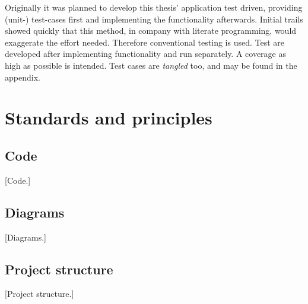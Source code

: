\documentclass[10pt, openright, notitlepage]{scrreprt}
\begin{document}
\begin{center}
\end{center}

Originally it was planned to develop this thesis' application test driven,
providing (unit-) test-cases first and implementing the functionality
afterwards. Initial trails showed quickly that this method, in company with
literate programming, would exaggerate the effort needed. Therefore conventional
testing is used. Test are developed after implementing functionality and run
separately. A coverage as high as possible is intended. Test cases are \emph{tangled}
too, and may be found in the appendix.
\begin{center}
\end{center}

\section{Standards and principles}
\label{sec:orga96e158}
\subsection{Code}
\label{sec:org7381509}

[Code.]

\subsection{Diagrams}
\label{sec:orgabc6487}

[Diagrams.]

\subsection{Project structure}
\label{sec:orgd94cb31}

[Project structure.]
\end{document}
